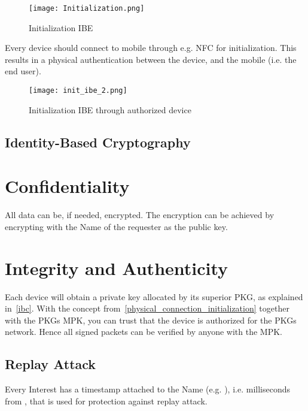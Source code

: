 \begin{figure}[ht]
  \centering
  \texttt{[image: Initialization.png]}
  \caption{Initialization IBE}
  \label{fig:init_ibe_1}
\end{figure}

Every device should connect to mobile through e.g. \gls{NFC} for initialization.
This results in a physical authentication between the device, and the mobile (i.e. the end user).

\begin{figure}[ht]
  \centering
  \texttt{[image: init\_ibe\_2.png]}
  \caption{Initialization IBE through authorized device}
  \label{fig:init_ibe_2}
\end{figure}



\subsection{Identity-Based Cryptography}

\section{Confidentiality}

All data can be, if needed, encrypted.
The encryption can be achieved by encrypting with the Name of the requester as the public key.


\section{Integrity and Authenticity}

Each device will obtain a private key allocated by its superior \gls{PKG}, as explained in~\autoref{ibc}.
With the concept from~\autoref{physical_connection_initialization} together with the \gls{PKG}s \gls{MPK}, you can trust that the device is authorized for the \gls{PKG}s network. Hence all signed packets can be verified by anyone with the \gls{MPK}.

\subsection{Replay Attack}
Every Interest has a timestamp attached to the Name (e.g. ), i.e. milliseconds from , that is used for protection against replay attack. 


